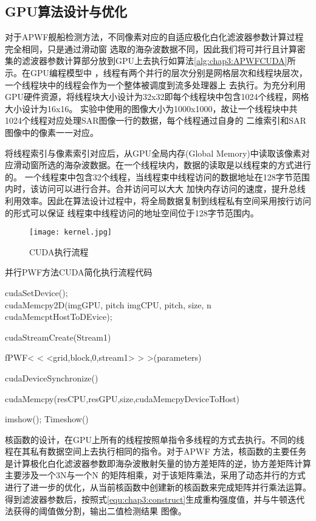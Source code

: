 \subsection{GPU算法设计与优化}
 对于APWF舰船检测方法，不同像素对应的自适应极化白化滤波器参数计算过程完全相同，只是通过滑动窗
 选取的海杂波数据不同，因此我们将可并行且计算密集的滤波器参数计算部分放到GPU上去执行如算法\ref{alg:chap3:APWFCUDA}所示。在GPU编程模型中
 ，线程有两个并行的层次分别是网格层次和线程块层次，一个线程块中的线程会作为一个整体被调度到流多处理器上
 去执行。为充分利用GPU硬件资源，将线程块大小设计为32x32即每个线程块中包含1024个线程，网格大小设计为16x16。
 实验中使用的图像大小为1000x1000，故让一个线程块中共1024个线程对应处理SAR图像一行的数据，每个线程通过自身的
 二维索引和SAR图像中的像素一一对应。

 将线程索引与像素索引对应后，从GPU全局内存(Global Memory)中读取该像素对应滑动窗所选的海杂波数据。在一个线程块内，数据的读取是以线程束的方式进行的。
 一个线程束中包含32个线程，当线程束中线程访问的数据地址在128字节范围内时，该访问可以进行合并。合并访问可以大大
 加快内存访问的速度，提升总线利用效率。因此在算法设计过程中，将全局数据复制到线程私有空间采用按行访问的形式可以保证
 线程束中线程访问的地址空间位于128字节范围内。

  \begin{figure}[H] %
    \centering
    \texttt{[image: kernel.jpg]}
    \caption{CUDA执行流程}
    \label{fig:chap3:kernel}
  \end{figure}

\begin{algorithm}[t]
  \caption{并行PWF方法CUDA简化执行流程代码}
  \label{alg:chap3:APWFCUDA}

  cudaSetDevice();\\cudaMemcpy2D(imgGPU, pitch imgCPU, pitch, size, n cudaMemcptHostToDEvice);

  cudaStreamCreate(Stream1)

  fPWF< < <grid,block,0,stream1> > >(parameters)

  cudaDeviceSynchronize()

  cudaMemcpy(resCPU,resGPU,size,cudaMemcpyDeviceToHost)

  imshow(); Timeshow()

 \end{algorithm}
 核函数的设计，在GPU上所有的线程按照单指令多线程的方式去执行。不同的线程在其私有数据空间上去执行相同的指令。对于APWF
 方法，核函数的主要任务是计算极化白化滤波器参数即海杂波散射矢量的协方差矩阵的逆，协方差矩阵计算主要涉及一个3\times N与一个N
 的矩阵相乘，对于该矩阵乘法，采用了动态并行的方式进行了进一步的优化，从当前核函数中创建新的核函数来完成矩阵并行乘法运算。
 得到滤波器参数后，按照式\ref{equ:chap3:construct}生成重构强度值，并与牛顿迭代法获得的阈值做分割，输出二值检测结果
 图像。
